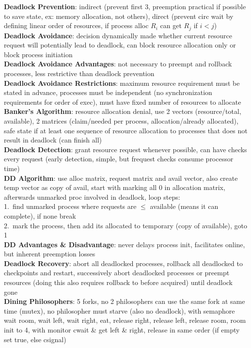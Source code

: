 \documentclass[a4paper]{article}
\begin{document}
\begin{multicols}{2}
        \textbf{Deadlock Prevention}: indirect (prevent first 3, preemption practical if possible to save state, ex: memory allocation, not others), direct (prevent circ wait by defining linear order of resources, if process alloc $R_i$ can get $R_j$ if $i < j$)\\
        \textbf{Deadlock Avoidance}: decision dynamically made whether current resource request will potentially lead to deadlock, can block resource allocation only or block process initiation\\
        \textbf{Deadlock Avoidance Advantages}: not necessary to preempt and rollback processes, less restrictive than deadlock prevention\\
        \textbf{Deadlock Avoidance Restrictions}: maximum resource requirement must be stated in advance, processes must be independent (no synchronization requirements for order of exec), must have fixed number of resources to allocate\\
        \textbf{Banker's Algorithm}: resource allocation denial, use 2 vectors (resource/total, available), 2 matrices (claim/needed per process, allocation/already allocated), safe state if at least one sequence of resource allocation to processes that does not result in deadlock (can finish all)\\
        \textbf{Deadlock Detection}: grant resource request whenever possible, can have checks every request (early detection, simple, but frequest checks consume processor time)\\
        \textbf{DD Algorithm}: use alloc matrix, request matrix and avail vector, also create temp vector as copy of avail, start with marking all 0 in allocation matrix, afterwards unmarked proc involved in deadlock, loop steps:\\
        1.\ find unmarked process where requests are $\leq$ available (means it can complete), if none break\\
        2.\ mark the process, then add its allocated to temporary (copy of available), goto 1\\
        \textbf{DD Advantages \& Disadvantage}: never delays process init, facilitates online, but inherent preemption losses\\
        \textbf{Deadlock Recovery}: abort all deadlocked processes, rollback all deadlocked to checkpoints and restart, successively abort deadlocked processes or preempt resources (doing this also requires rollback to before acquired) until deadlock gone\\
        \textbf{Dining Philosophers}: 5 forks, no 2 philosophers can use the same fork at same time (mutex), no philosopher must starve (also no deadlock), with semaphore wait room, wait left, wait right, eat, release right, release left, release room, room init to 4, with monitor cwait \& get left \& right, release in same order (if empty set true, else csignal)\\

\end{multicols}
\end{document}
